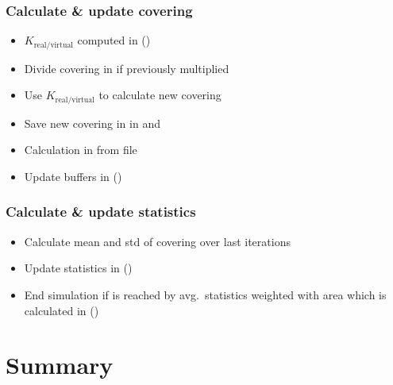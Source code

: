 \subsubsection{Calculate \& update covering}
\begin{itemize}[noitemsep,topsep=0pt, partopsep=0pt]
\item $K_{\text{real}/\text{virtual}}$ computed in  ()
\item Divide covering in   if previously multiplied
\item Use $K_{\text{real}/\text{virtual}}$ to calculate new covering
\item Save new covering in  in  and 
\item Calculation in  from  file
\item Update buffers in  ()
\end{itemize}

\subsubsection{Calculate \& update statistics}
\begin{itemize}[noitemsep,topsep=0pt, partopsep=0pt]
\item Calculate mean and std of covering over last  iterations
\item Update statistics in  ()
\item End simulation if  is reached by avg.\ statistics weighted with area which is calculated in  ()
\end{itemize}

\newpage
\section{Summary}
